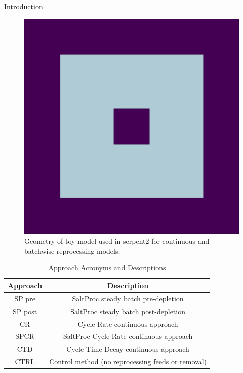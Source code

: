 \documentclass[final]{beamer}
\newlength{\onecolwid}
\newlength{\threecolwid}
\begin{document}
\begin{frame}[t]
\begin{columns}[t,totalwidth=\threecolwid]
\begin{column}{\onecolwid}
\begin{block}{Introduction}
\begin{figure}
	\label{fig:toy_geom}
	\includegraphics[width=0.6\linewidth]{images/CR0_geom1.png}
	\caption{Geometry of toy model used in serpent2 for continuous and batchwise reprocessing models.}
\end{figure}



\begin{table}[H]
\renewcommand{\arraystretch}{1.25}
\caption{Approach Acronyms and Descriptions}
\label{tab:res_key}
\begin{center}
\begin{tabular}{ | c | c | }
 \hline
        Approach & Description\\
 \hline
 \hline
 	SP pre & SaltProc steady batch pre-depletion\\
	SP post & SaltProc steady batch post-depletion\\
	CR & Cycle Rate continuous approach\\
	SPCR & SaltProc Cycle Rate continuous approach\\
	CTD & Cycle Time Decay continuous approach\\
	CTRL & Control method (no reprocessing feeds or removal)\\
 \hline
\end{tabular}
\end{center}
\end{table}

\end{block}



\end{column}
\end{columns}
\end{frame}
\end{document}
